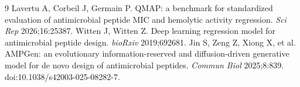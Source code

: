 \documentclass[11pt,a4paper]{article}
\begin{document}
\begingroup\raggedright\begin{thebibliography}{9}
 Lavertu A, Corbeil J, Germain P. QMAP: a benchmark for standardized evaluation of antimicrobial peptide MIC and hemolytic activity regression. \textit{Sci Rep} 2026;16:25387.
 Witten J, Witten Z. Deep learning regression model for antimicrobial peptide design. \textit{bioRxiv} 2019;692681.
 Jin S, Zeng Z, Xiong X, et al. AMPGen: an evolutionary information-reserved and diffusion-driven generative model for de novo design of antimicrobial peptides. \textit{Commun Biol} 2025;8:839. doi:10.1038/s42003-025-08282-7.
\end{thebibliography}\endgroup
\end{document}
